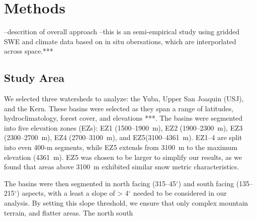 




\hypertarget{ch2-sa}{\section{Methods}\label{ch2-sa}}

--descrition of overall approach
--this is an semi-empirical study using gridded SWE and climate data based on in situ obersations, which are interporlated across space.***

\hypertarget{ch2-sa}{\subsection{Study Area}\label{ch2-sa}}

We selected three watersheds to analyze: the Yuba, Upper San Joaquin (USJ), and the Kern. These basins were selected as they span a range of latitudes, hydroclimatology, forest cover, and elevations ***. The basins were segmented into five elevation zones (EZs): EZ1 (1500--1900~m), EZ2 (1900--2300~m), EZ3 (2300--2700~m), EZ4 (2700--3100~m), and EZ5(3100--4361~m). EZ1--4 are split into even 400-m segments, while EZ5 extends from 3100~m to the maximum elevation (4361~m). EZ5 was chosen to be larger to simplify our results, as we found that areas above 3100~m exhibited similar snow metric characteristics. 

The basins were then segmented in north facing (315--45$^{\circ}$) and south facing (135--215$^{\circ}$) aspects, with a least a slope of > 4$^{\circ}$ needed to be considered in our analysis. By setting this slope threshold, we ensure that only complex mountain terrain, and flatter areas. The north south 

